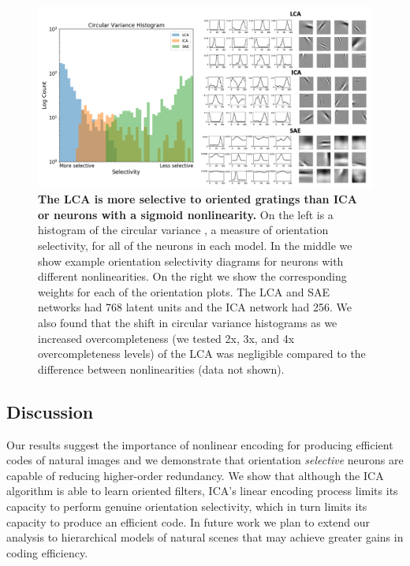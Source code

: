\begin{figure}[h]
    \centering
    \includegraphics[width=\textwidth]{figures/circular_variance_histogram.png}
    \caption{\textbf{The LCA is more selective to oriented gratings than ICA or neurons with a sigmoid nonlinearity.} On the left is a histogram of the circular variance \parencite{ringach2002orientation}, a measure of orientation selectivity, for all of the neurons in each model. In the middle we show example orientation selectivity diagrams for neurons with different nonlinearities. On the right we show the corresponding weights for each of the orientation plots. The LCA and SAE networks had 768 latent units and the ICA network had 256. We also found that the shift in circular variance histograms as we increased overcompleteness (we tested 2x, 3x, and 4x overcompleteness levels) of the LCA was negligible compared to the difference between nonlinearities (data not shown).}
    \label{fig:ch4_orientation_selectivity}
\end{figure}


\subsection{Discussion}
Our results suggest the importance of nonlinear encoding for producing efficient codes of natural images and we demonstrate that orientation \textit{selective} neurons are capable of reducing higher-order redundancy. We show that although the ICA algorithm is able to learn oriented filters, ICA's linear encoding process limits its capacity to perform genuine orientation selectivity, which in turn limits its capacity to produce an efficient code. In future work we plan to extend our analysis to hierarchical models of natural scenes that may achieve greater gains in coding efficiency.


